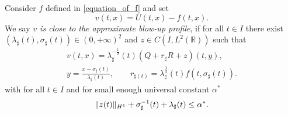 \documentclass[16pt,english, oneside,reqno]{smfart}
\newcommand{\RR}{\mathbb{R}}
\begin{document}
Consider $f$ defined in \eqref{equation_of_f} and set
\begin{equation}
    v(t,x) = U(t,x) - f(t,x).
\end{equation}
We say \textit{$v$ is close to the approximate blow-up profile}, if for all $t \in I$ there exist $(\lambda_{\sharp}(t), \sigma_{\sharp}(t))\in (0,+\infty)^2$ and $z \in C(I,L^2(\RR))$ such that
\begin{equation}\label{supposed_decomposition_around_Q}
\begin{split}
    v(t,x)=\lambda^{-\frac{1}{2}}_{\sharp}(t)(Q+r_{\sharp}R+z)(t,y),\\
     y= \frac{x-\sigma_{\sharp}(t)}{\lambda_{\sharp}(t)},\qquad  r_{\sharp(t)}= \lambda^{\frac{1}{2}}_{\sharp}(t)f(t,\sigma_{\sharp}(t)).
\end{split}
\end{equation}
with for all $t \in I$ and for small enough universal constant $\alpha^*$
\begin{equation}\label{supposed_decomposition_around_Q_condition}
    \|z(t)\|_{H^1}+ \sigma_{\sharp}^{-1}(t)+\lambda_{\sharp}(t ) \leq \alpha^{*}.\\
\end{equation}
\end{document}
